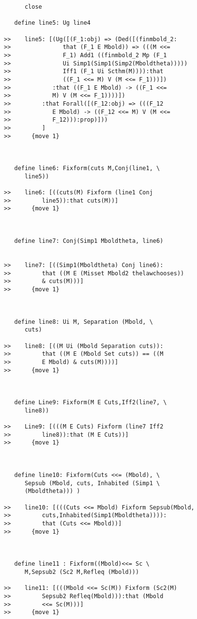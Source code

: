 \documentclass[12pt]{article}
\begin{document}
\begin{verbatim}
      close

   define line5: Ug line4

>>    line5: [(Ug([(F_1:obj) => (Ded([(finmbold_2:
>>               that (F_1 E Mbold)) => (((M <<=
>>               F_1) Add1 ((finmbold_2 Mp (F_1
>>               Ui Simp1(Simp1(Simp2(Mboldtheta)))))
>>               Iff1 (F_1 Ui Scthm(M)))):that
>>               ((F_1 <<= M) V (M <<= F_1)))])
>>            :that ((F_1 E Mbold) -> ((F_1 <<=
>>            M) V (M <<= F_1))))])
>>         :that Forall([(F_12:obj) => (((F_12
>>            E Mbold) -> ((F_12 <<= M) V (M <<=
>>            F_12))):prop)]))
>>         ]
>>      {move 1}



   define line6: Fixform(cuts M,Conj(line1, \
      line5))

>>    line6: [((cuts(M) Fixform (line1 Conj
>>         line5)):that cuts(M))]
>>      {move 1}



   define line7: Conj(Simp1 Mboldtheta, line6)


>>    line7: [((Simp1(Mboldtheta) Conj line6):
>>         that ((M E (Misset Mbold2 thelawchooses))
>>         & cuts(M)))]
>>      {move 1}



   define line8: Ui M, Separation (Mbold, \
      cuts)

>>    line8: [((M Ui (Mbold Separation cuts)):
>>         that ((M E (Mbold Set cuts)) == ((M
>>         E Mbold) & cuts(M))))]
>>      {move 1}



   define Line9: Fixform(M E Cuts,Iff2(line7, \
      line8))

>>    Line9: [(((M E Cuts) Fixform (line7 Iff2
>>         line8)):that (M E Cuts))]
>>      {move 1}



   define line10: Fixform(Cuts <<= (Mbold), \
      Sepsub (Mbold, cuts, Inhabited (Simp1 \
      (Mboldtheta))) )

>>    line10: [(((Cuts <<= Mbold) Fixform Sepsub(Mbold,
>>         cuts,Inhabited(Simp1(Mboldtheta)))):
>>         that (Cuts <<= Mbold))]
>>      {move 1}



   define line11 : Fixform((Mbold)<<= Sc \
      M,Sepsub2 (Sc2 M,Refleq (Mbold)))

>>    line11: [(((Mbold <<= Sc(M)) Fixform (Sc2(M)
>>         Sepsub2 Refleq(Mbold))):that (Mbold
>>         <<= Sc(M)))]
>>      {move 1}




\end{verbatim}
\end{document}
